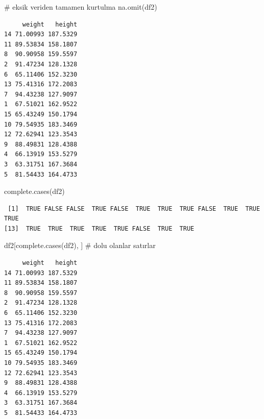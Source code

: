 \documentclass[
  letterpaper,
  DIV=11,
  numbers=noendperiod]{scrreprt}
\newenvironment{Shaded}{\begin{snugshade}}{\end{snugshade}}
\newcommand{\CommentTok}[1]{\textcolor[rgb]{0.37,0.37,0.37}{#1}}
\newcommand{\FunctionTok}[1]{\textcolor[rgb]{0.28,0.35,0.67}{#1}}
\newcommand{\NormalTok}[1]{\textcolor[rgb]{0.00,0.23,0.31}{#1}}
\newcommand{\SpecialCharTok}[1]{\textcolor[rgb]{0.37,0.37,0.37}{#1}}
\begin{document}
\begin{Shaded}
\begin{Highlighting}[]
\CommentTok{\# eksik veriden tamamen kurtulma}
\FunctionTok{na.omit}\NormalTok{(df2)}
\end{Highlighting}
\end{Shaded}

\begin{verbatim}
     weight   height
14 71.00993 187.5329
11 89.53834 158.1807
8  90.90958 159.5597
2  91.47234 128.1328
6  65.11406 152.3230
13 75.41316 172.2083
7  94.43238 127.9097
1  67.51021 162.9522
15 65.43249 150.1794
10 79.54935 183.3469
12 72.62941 123.3543
9  88.49831 128.4388
4  66.13919 153.5279
3  63.31751 167.3684
5  81.54433 164.4733
\end{verbatim}

\begin{Shaded}
\begin{Highlighting}[]
\FunctionTok{complete.cases}\NormalTok{(df2)}
\end{Highlighting}
\end{Shaded}

\begin{verbatim}
 [1]  TRUE FALSE FALSE  TRUE FALSE  TRUE  TRUE  TRUE FALSE  TRUE  TRUE  TRUE
[13]  TRUE  TRUE  TRUE  TRUE  TRUE FALSE  TRUE  TRUE
\end{verbatim}

\begin{Shaded}
\begin{Highlighting}[]
\NormalTok{df2[}\FunctionTok{complete.cases}\NormalTok{(df2), ] }\CommentTok{\# dolu olanlar satırlar}
\end{Highlighting}
\end{Shaded}

\begin{verbatim}
     weight   height
14 71.00993 187.5329
11 89.53834 158.1807
8  90.90958 159.5597
2  91.47234 128.1328
6  65.11406 152.3230
13 75.41316 172.2083
7  94.43238 127.9097
1  67.51021 162.9522
15 65.43249 150.1794
10 79.54935 183.3469
12 72.62941 123.3543
9  88.49831 128.4388
4  66.13919 153.5279
3  63.31751 167.3684
5  81.54433 164.4733
\end{verbatim}

\begin{Shaded}
\end{Shaded}
\end{document}
